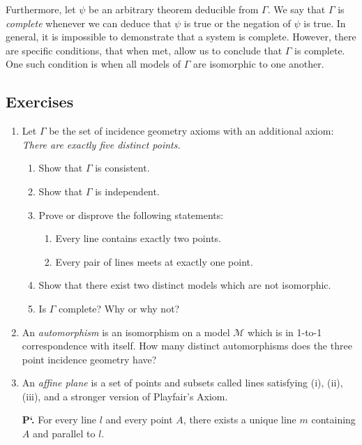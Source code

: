 \documentclass[12pt]{book}
\def\cM{{\mathcal{M}}}
\begin{document}
	Furthermore, let $\psi$ be an arbitrary theorem deducible from $\Gamma$. We say that $\Gamma$ is \textit{complete} whenever we can deduce that $\psi$ is true or the negation of $\psi$ is true. In general, it is impossible to demonstrate that a system is complete. However, there are specific conditions, that when met, allow us to conclude that $\Gamma$ is complete. One such condition is when all models of $\Gamma$ are isomorphic to one another.
	
\subsection*{Exercises}
\begin{enumerate}
\item Let $\Gamma$ be the set of incidence geometry axioms with an additional axiom: \textit{There are exactly five distinct points.}
\begin{enumerate}
	\item Show that $\Gamma$ is consistent.
	\item Show that $\Gamma$ is independent.
	\item Prove or disprove the following statements:
	\begin{enumerate}
		\item Every line contains exactly two points.
		\item Every pair of lines meets at exactly one point.
	\end{enumerate}
	\item Show that there exist two distinct models which are not isomorphic.
	\item Is $\Gamma$ complete? Why or why not?
\end{enumerate}
\item An \textit{automorphism} is an isomorphism on a model $\cM$ which is in 1-to-1 correspondence with itself. How many distinct automorphisms does the three point incidence geometry have?
\item An \textit{affine plane} is a set of points and subsets called lines satisfying (i), (ii), (iii), and a stronger version of Playfair's Axiom.

\noindent \textbf{P`.} For every line $l$ and every point $A$, there exists a unique line $m$ containing $A$ and parallel to $l$. 


\end{enumerate}
\end{document}
